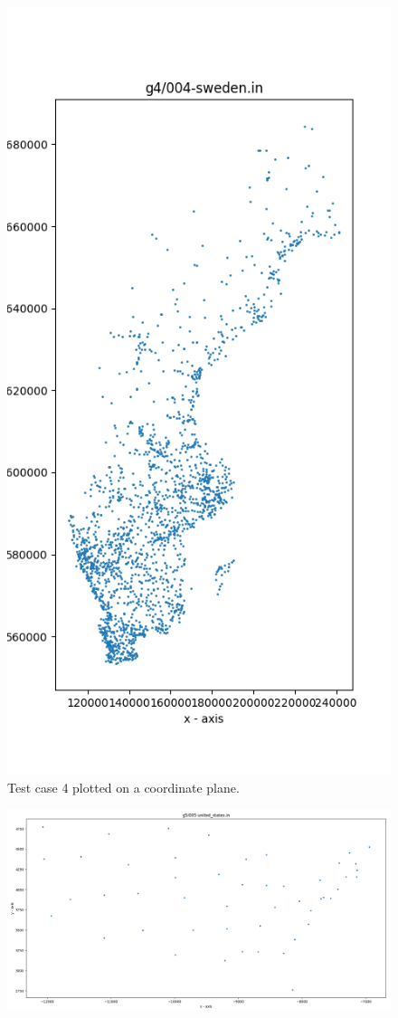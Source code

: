 \documentclass{article}
\begin{document}
\begin{appendices}
\begin{figure}[H]
	\includegraphics[scale=0.5]{code/visualizer/testdata/04.png}
	\caption{Test case 4 plotted on a coordinate plane.}
	\label{fig:04}
\end{figure}
\begin{figure}[H]
	\centering
	\includegraphics[scale=0.4]{code/visualizer/testdata/05.png}

\end{figure}
\end{appendices}
\end{document}
